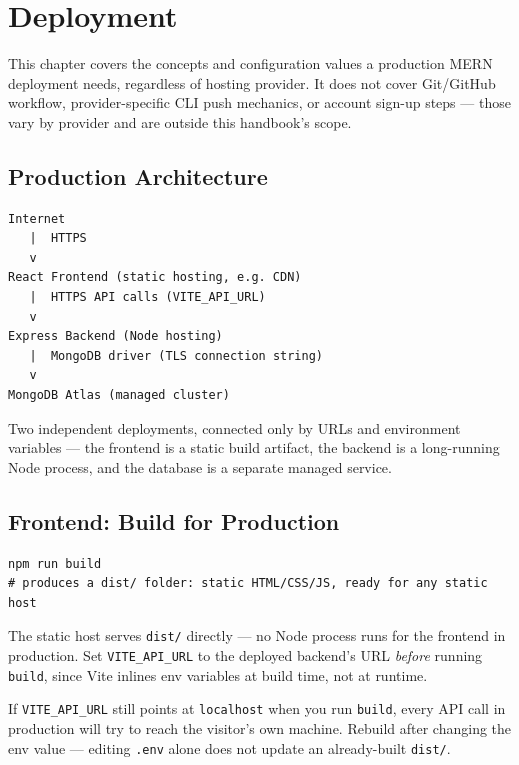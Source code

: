 \chapter{Deployment}

\begin{notebox}[NOTE]
This chapter covers the concepts and configuration values a production
MERN deployment needs, regardless of hosting provider. It does not cover
Git/GitHub workflow, provider-specific CLI push mechanics, or account
sign-up steps --- those vary by provider and are outside this handbook's
scope.
\end{notebox}

\section{Production Architecture}

\begin{diagrambox}
\begin{verbatim}
Internet
   |  HTTPS
   v
React Frontend (static hosting, e.g. CDN)
   |  HTTPS API calls (VITE_API_URL)
   v
Express Backend (Node hosting)
   |  MongoDB driver (TLS connection string)
   v
MongoDB Atlas (managed cluster)
\end{verbatim}
\end{diagrambox}

Two independent deployments, connected only by URLs and environment
variables --- the frontend is a static build artifact, the backend is a
long-running Node process, and the database is a separate managed service.

\section{Frontend: Build for Production}

\begin{lstlisting}
npm run build
# produces a dist/ folder: static HTML/CSS/JS, ready for any static host
\end{lstlisting}

The static host serves \texttt{dist/} directly --- no Node process runs
for the frontend in production. Set \texttt{VITE\_API\_URL} to the
deployed backend's URL \emph{before} running \texttt{build}, since Vite
inlines env variables at build time, not at runtime.

\begin{warnbox}[WARNING]
If \texttt{VITE\_API\_URL} still points at \texttt{localhost} when you
run \texttt{build}, every API call in production will try to reach the
visitor's own machine. Rebuild after changing the env value --- editing
\texttt{.env} alone does not update an already-built \texttt{dist/}.
\end{warnbox}

